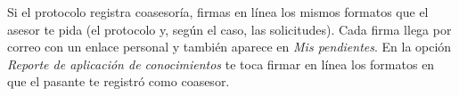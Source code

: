 \documentclass[11pt,a4paper]{article}
\begin{document}
{\small\tableofcontents}
\newpage
\begin{quevasahacer}
Si el protocolo registra coasesoría, firmas en línea los mismos formatos que el asesor te pida (el protocolo y, según el caso, las solicitudes). Cada firma llega por correo con un enlace personal y también aparece en \emph{Mis pendientes}. En la opción \emph{Reporte de aplicación de conocimientos} te toca firmar en línea los formatos en que el pasante te registró como coasesor.
\end{quevasahacer}



\end{document}
